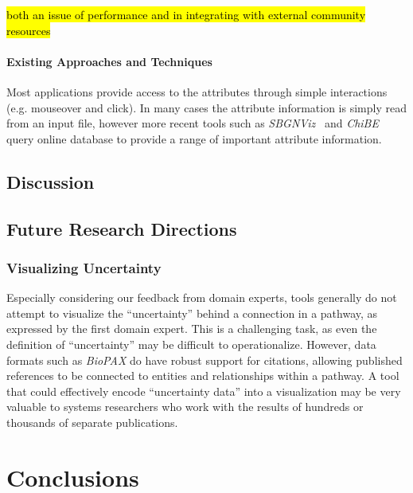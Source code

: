 \hl{both an issue of performance and in integrating with external community resources}

\paragraph*{Existing Approaches and Techniques}

Most applications provide access to the attributes through simple interactions (e.g. mouseover and click).
In many cases the attribute information is simply read from an input file, however more recent tools such as \textit{SBGNViz}~\cite{SBGNViz2015} and \textit{ChiBE}\cite{Babur2010chibe} query online database to provide a range of important attribute information.

\subsection*{Discussion}

\subsection*{Future Research Directions}

\subsubsection*{Visualizing Uncertainty}

Especially considering our feedback from domain experts, tools generally do not attempt to visualize the ``uncertainty'' behind a connection in a pathway, as expressed by the first domain expert. This is a challenging task, as even the definition of ``uncertainty'' may be difficult to operationalize. However, data formats such as \emph{BioPAX} do have robust support for citations, allowing published references to be connected to entities and relationships within a pathway. A tool that could effectively encode ``uncertainty data'' into a visualization may be very valuable to systems researchers who work with the results of hundreds or thousands of separate publications.

\section*{Conclusions}
